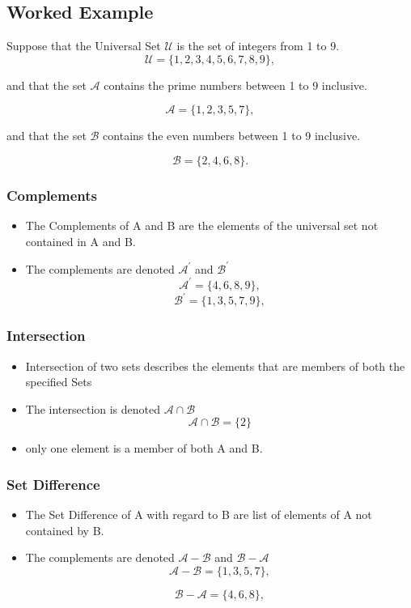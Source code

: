 \documentclass[11pt,a4paper,titlepage,oneside,openany]{article}
\numberwithin{equation}{section}
\numberwithin{algorithm}{section}
\numberwithin{figure}{section}
\numberwithin{table}{section}
\begin{document}
\subsection*{Worked Example}

Suppose that the Universal Set $\mathcal{U}$ is the set of integers from 1 to 9.
\[ \mathcal{U} = \{1,2,3,4,5,6,7,8,9\}, \]

and that the set $\mathcal{A}$ contains the prime numbers between 1 to 9 inclusive.

\[ \mathcal{A} = \{1,2,3,5,7\}, \]

and that the set $\mathcal{B}$ contains the even numbers between 1 to 9 inclusive.

\[ \mathcal{B} = \{2,4,6,8\}. \]

\subsubsection*{Complements}
\begin{itemize}

\item The Complements of A and B are the elements of the universal set not contained in A and B.

\item The complements are denoted $\mathcal{A}^{\prime}$ and $\mathcal{B}^{\prime}$
\[ \mathcal{A}^{\prime} = \{4,6,8,9\}, \]
\[ \mathcal{B}^{\prime} = \{1,3,5,7,9\}, \]

\end{itemize}


\subsubsection*{Intersection}
\begin{itemize}

\item Intersection of two sets describes the elements that are members of both the specified Sets

\item The intersection is denoted $\mathcal{A\cap B}$ 
\[ \mathcal{A\cap B} = \{2\}\]

\item only one element is a member of both A and B.
\end{itemize}

\subsubsection*{Set Difference}
\begin{itemize}

\item The Set Difference of A with regard to B are list of elements of A not contained by B.

\item The complements are denoted $\mathcal{A-B}$ and $\mathcal{B-A}$
\[ \mathcal{A-B} = \{1,3,5,7\}, \]

\[ \mathcal{B-A} = \{4,6,8\}, \]
\end{itemize}
\end{document}
